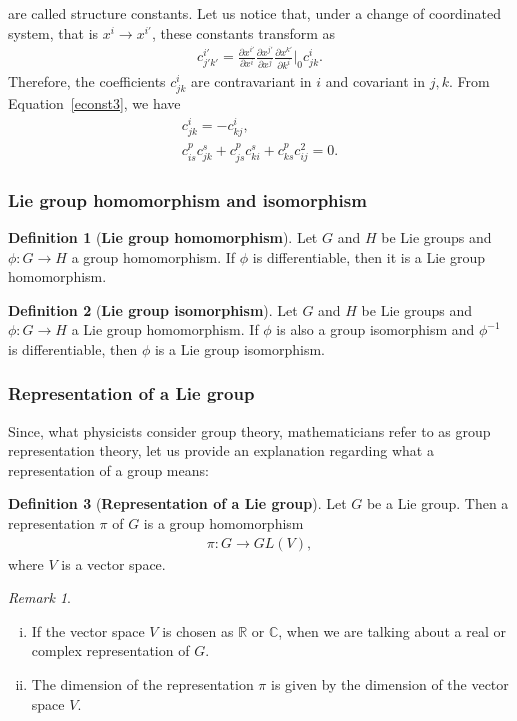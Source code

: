 \documentclass[12pt,a4paper]{report}
\theoremstyle{definition}
\newtheorem{definition}{Definition}
\theoremstyle{remark}
\newtheorem*{remark}{Remark}
\theoremstyle{remark}
\begin{document}
are called structure constants. Let us notice that, under a change of coordinated system, that is $x^i\rightarrow x^{i'}$, these constants transform as
\begin{align*}
c_{j'k'}^{i'}=\frac{\partial x^{i'}}{\partial x^i}\frac{\partial x^{j'}}{\partial x^j}\frac{\partial x^{k'}}{\partial k^i}\bigg\rvert_{0}c_{jk}^i.
\end{align*}
Therefore, the coefficients $c_{jk}^i$ are contravariant in $i$ and covariant in $j,k$. From Equation~\ref{econst3}, we have
\begin{equation}\label{econst4}
\begin{aligned}
c_{jk}^i=-c_{kj}^i,\\
c_{is}^pc_{jk}^s+c_{js}^pc_{ki}^s+c_{ks}^pc_{ij}^2=0.
\end{aligned}
\end{equation}

\subsubsection{Lie group homomorphism and isomorphism}
\begin{definition}[\textbf{Lie group homomorphism}]
Let $G$ and $H$ be Lie groups and $\phi:G\rightarrow H$ a group homomorphism.  If $\phi$ is differentiable, then it is a Lie group homomorphism. 
\end{definition}
\begin{definition}[\textbf{Lie group isomorphism}]
Let $G$ and $H$ be Lie groups and $\phi:G\rightarrow H$ a Lie group homomorphism. If $\phi$ is also a group isomorphism and $\phi^{-1}$ is differentiable, then $\phi$ is a Lie group isomorphism.
\end{definition}

\subsubsection{Representation of a Lie group}
Since, what physicists consider group theory, mathematicians refer to as group representation theory, let us provide an explanation regarding what a representation of a group means:
\begin{definition}[\textbf{Representation of a Lie group}] Let $G$ be a Lie group. Then a representation $\pi$ of $G$ is a group homomorphism
\begin{align*}
\pi:G\rightarrow GL(V),
\end{align*}
where $V$ is a vector space. 
\end{definition}
\begin{remark}\mbox{}
\begin{enumerate}[i.]
\item If the vector space $V$ is chosen as $\mathbb{R}$ or $\mathbb{C}$, when we are talking about a real or complex representation of $G$.
\item The dimension of the representation $\pi$ is given by the dimension of the vector space $V$.
\end{enumerate}
\end{remark}
\end{document}
